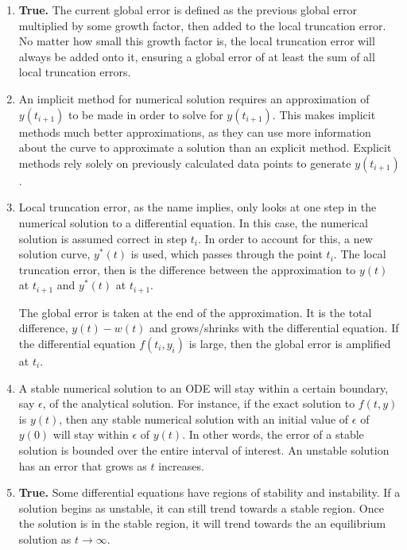 \documentclass[11pt]{article}
\begin{document}
\begin{enumerate}
\begin{enumerate}
		\medskip

		\item \textbf{True.} The current global error is defined as the previous global error multiplied by some growth factor, then added to the local truncation error. No matter how small this growth factor is, the local truncation error will always be added onto it, ensuring a global error of at least the sum of all local truncation errors.

		\medskip

		\item An implicit method for numerical solution requires an approximation of $y(t_{i+1})$ to be made in order to solve for $y(t_{i+1})$. This makes implicit methods much better approximations, as they can use more information about the curve to approximate a solution than an explicit method. Explicit methods rely solely on previously calculated data points to generate $y(t_{i+1})$.

		\medskip

		\item Local truncation error, as the name implies, only looks at one step in the numerical solution to a differential equation. In this case, the numerical solution is assumed correct in step $t_i$. In order to account for this, a new solution curve, $y^*(t)$ is used, which passes through the point $t_i$. The local truncation error, then is the difference between the approximation to $y(t)$ at $t_{i+1}$ and $y^*(t)$ at $t_{i+1}$.

		The global error is taken at the end of the approximation. It is the total difference, $y(t)-w(t)$ and grows/shrinks with the differential equation. If the differential equation $f(t_i,y_i)$ is large, then the global error is amplified at $t_i$.

		\medskip

		\item A stable numerical solution to an ODE will stay within a certain boundary, say $\epsilon$, of the analytical solution. For instance, if the exact solution to $f(t,y)$ is $y(t)$, then any stable numerical solution with an initial value of $\epsilon$ of $y(0)$ will stay within $\epsilon$ of $y(t)$. In other words, the error of a stable solution is bounded over the entire interval of interest. An unstable solution has an error that grows as $t$ increases.

		\medskip

		\item \textbf{True.} Some differential equations have regions of stability and instability. If a solution begins as unstable, it can still trend towards a stable region. Once the solution is in the stable region, it will trend towards the an equilibrium solution as $t\to\infty$.


\end{enumerate}
\end{enumerate}
\end{document}
